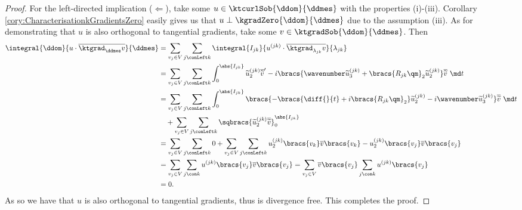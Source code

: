 \begin{proof}
	For the left-directed implication ($\Leftarrow$), take some $u\in\ktcurlSob{\ddom}{\ddmes}$ with the properties (i)-(iii).
	Corollary \ref{cory:CharacterisationkGradientsZero} easily gives us that $u\perp\kgradZero{\ddom}{\ddmes}$ due to the assumption (iii).
	As for demonstrating that $u$ is also orthogonal to tangential gradients, take some $v\in\ktgradSob{\ddom}{\ddmes}$.
	Then
	\begin{align*}
		\integral{\ddom}{u\cdot\overline{\ktgrad_{\ddmes}v}}{\ddmes}
		&= \sum_{v_j\in V}\sum_{j\conLeft k}\integral{I_{jk}}{u^{(jk)}\cdot\overline{\ktgrad_{\lambda_{jk}}v}}{\lambda_{jk}} \\
		&= \sum_{v_j\in V}\sum_{j\conLeft k}\int_0^{\abs{I_{jk}}} \widetilde{u}_2^{(jk)}\overline{\widetilde{v}}' - i\bracs{\wavenumber\widetilde{u}_3^{(jk)} + \bracs{R_{jk}\qm}_2\widetilde{u}_2^{(jk)}}\overline{\widetilde{v}} \ \md t \\
		&= \sum_{v_j\in V}\sum_{j\conLeft k}\int_0^{\abs{I_{jk}}} \bracs{-\bracs{\diff{}{t} + i\bracs{R_{jk}\qm}_2}\widetilde{u}^{(jk)}_2 - i\wavenumber\widetilde{u}^{(jk)}_3}\overline{\widetilde{v}} \ \md t \\
		& \quad + \sum_{v_j\in V}\sum_{j\conLeft k}\sqbracs{\widetilde{u}_2^{(jk)}\overline{\widetilde{v}}}_0^{\abs{I_{jk}}} \\
		&= \sum_{v_j\in V}\sum_{j\conLeft k}0 + \sum_{v_j\in V}\sum_{j\conLeft k} u_2^{(jk)}\bracs{v_k}\overline{v}\bracs{v_k} - u_2^{(jk)}\bracs{v_j}\overline{v}\bracs{v_j} \\
		&= \sum_{v_j\in V}\sum_{j\con k} u^{(jk)}\bracs{v_j}\overline{v}\bracs{v_j}
		= \sum_{v_j\in V}\overline{v}\bracs{v_j}\sum_{j\con k} u^{(jk)}\bracs{v_j} \\
		& = 0.
	\end{align*}
	As so we have that $u$ is also orthogonal to tangential gradients, thus is divergence free.
	This completes the proof.
\end{proof}

